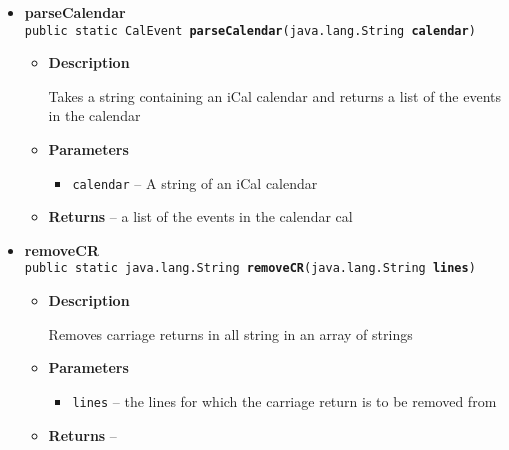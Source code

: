 \documentclass[11pt,a4paper]{report}
\begin{document}
{{{\begin{itemize}
{\begin{itemize}
{Takes an string array containing an iCal event, and returns the value of the type
}
\item{
{\bf  Parameters}
  \begin{itemize}
   \item{
\texttt{event} -- the event to be parsed}
   \item{
\texttt{type} -- the type of the value to be fished out}
  \end{itemize}
}%
\item{{\bf  Returns} -- 
the value of the type type in the event 
}%
\end{itemize}
}%
\item{ 
\hypertarget{is.mpg.ruglan.iCalParser.parseCalendar(java.lang.String)}{{\bf  parseCalendar}\\}
\texttt{public static CalEvent\lbrack \rbrack \ {\bf  parseCalendar}(\texttt{java.lang.String} {\bf  calendar})
\label{is.mpg.ruglan.iCalParser.parseCalendar(java.lang.String)}}%
\begin{itemize}
\item{
{\bf  Description}

Takes a string containing an iCal calendar and returns a list of the events in the calendar
}
\item{
{\bf  Parameters}
  \begin{itemize}
   \item{
\texttt{calendar} -- A string of an iCal calendar}
  \end{itemize}
}%
\item{{\bf  Returns} -- 
a list of the events in the calendar cal 
}%
\end{itemize}
}%
\item{ 
\hypertarget{is.mpg.ruglan.iCalParser.removeCR(java.lang.String[])}{{\bf  removeCR}\\}
\texttt{public static java.lang.String\lbrack \rbrack \ {\bf  removeCR}(\texttt{java.lang.String\lbrack \rbrack } {\bf  lines})
\label{is.mpg.ruglan.iCalParser.removeCR(java.lang.String[])}}%
\begin{itemize}
\item{
{\bf  Description}

Removes carriage returns in all string in an array of strings
}
\item{
{\bf  Parameters}
  \begin{itemize}
   \item{
\texttt{lines} -- the lines for which the carriage return is to be removed from}
  \end{itemize}
}%
\item{{\bf  Returns} -- 
 
}
\end{itemize}}
\end{itemize}}}}
\end{document}
